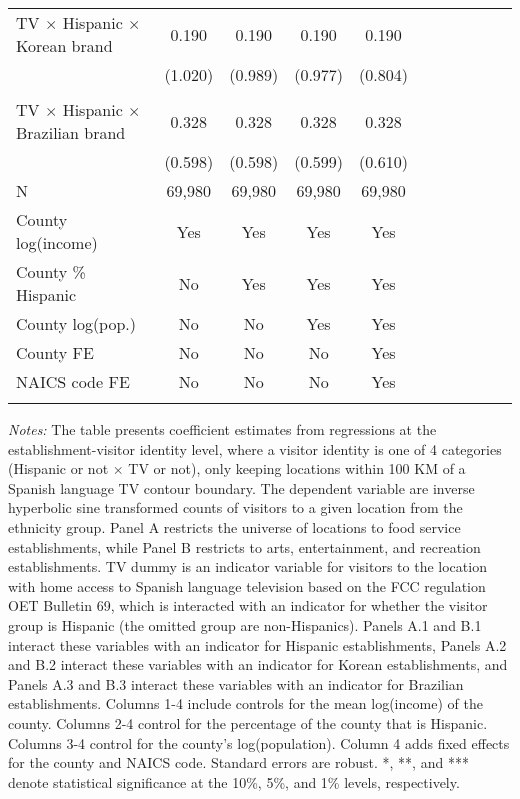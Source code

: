 \begin{table}[!htbp]
{\begin{threeparttable}
\begin{tabular}{lcccccccccc}
                              	\hline\addlinespace
				TV $\times$ Hispanic $\times$ Korean brand&       0.190 & 0.190 & 0.190 & 0.190 \\
		                    &     (1.020)   &     (0.989)   &     (0.977)   &     (0.804)   \\
				\addlinespace\hline
				\multicolumn{4}{l}{Panel A.3: Recreation --- Brazilian dummy} \\ 
                              	\hline\addlinespace
				TV $\times$ Hispanic $\times$ Brazilian brand&       0.328 & 0.328 & 0.328 & 0.328 \\
		                    &     (0.598)   &     (0.598)   &     (0.599)   &     (0.610)   \\
				\addlinespace\hline
				N & 69,980 & 69,980 & 69,980 & 69,980 \\ 
				\hline\hline\addlinespace
				County log(income) & Yes & Yes & Yes & Yes \\
				County \% Hispanic & No & Yes & Yes & Yes \\
				County log(pop.) & No & No & Yes & Yes \\
				County FE & No & No & No & Yes \\
				NAICS code FE & No & No & No & Yes \\
					\addlinespace\hline\hline
			\end{tabular}
			\begin{tablenotes}[flushleft]
				\item \textit{Notes:} The table presents coefficient estimates from regressions at the establishment-visitor identity level, where a visitor identity is one of 4 categories (Hispanic or not $\times$ TV or not), only keeping locations within 100 KM of a Spanish language TV contour boundary. The dependent variable are inverse hyperbolic sine transformed counts of visitors to a given location from the ethnicity group. Panel A restricts the universe of locations to food service establishments, while Panel B restricts to arts, entertainment, and recreation establishments. TV dummy is an indicator variable for visitors to the location with home access to Spanish language television based on the FCC regulation OET Bulletin 69, which is interacted with an indicator for whether the visitor group is Hispanic (the omitted group are non-Hispanics). Panels A.1 and B.1 interact these variables with an indicator for Hispanic establishments, Panels A.2 and B.2 interact these variables with an indicator for Korean establishments, and Panels A.3 and B.3 interact these variables with an indicator for Brazilian establishments.   Columns 1-4 include controls for the mean log(income) of the county. Columns 2-4 control for the percentage of the county that is Hispanic. Columns 3-4 control for the county's log(population). Column 4 adds fixed effects for the county and NAICS code. Standard errors are robust. *, **, and *** denote statistical significance at the 10\%, 5\%, and 1\% levels, respectively.
			\end{tablenotes}
		\end{threeparttable}
	}
\end{table}